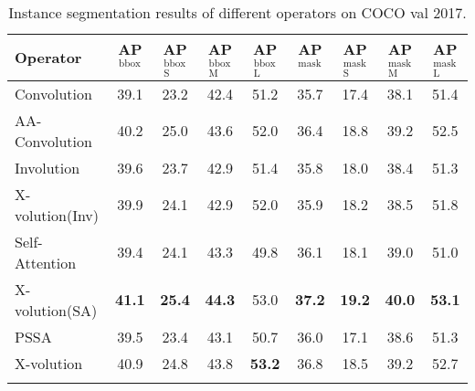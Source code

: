 \documentclass{article}
\newcommand{\cgap}[2]{
	\fontsize{6pt}{1em}\selectfont{(${#1}${#2})}
}
\newcommand{\apbbox}[1]{AP$^\text{bbox}_\text{#1}$}
\newcommand{\apmask}[1]{AP$^\text{mask}_\text{#1}$}
\begin{document}
\begin{table*}[t]\centering
\caption{Instance segmentation results of different operators on COCO val 2017.}
 \begin{spacing}{1.3}
 \small
\setlength\tabcolsep{0.9pt}
 \begin{tabular}{l|c|c|c|c|c|c|c|c}
        \Xhline{1.1pt}
		Operator
		& \fontsize{7pt}{1em}\selectfont \quad\apbbox{~}
		& \fontsize{7pt}{1em}\selectfont \quad\apbbox{S}
		& \fontsize{7pt}{1em}\selectfont \quad\apbbox{M}
		& \fontsize{7pt}{1em}\selectfont \quad\apbbox{L}
		& \fontsize{7pt}{1em}\selectfont \quad\apmask{~}
		& \fontsize{7pt}{1em}\selectfont \quad\apmask{S}
		& \fontsize{7pt}{1em}\selectfont \quad\apmask{M}
		& \fontsize{7pt}{1em}\selectfont \quad\apmask{L}\\ \hline
        
        Convolution &39.1 & 23.2 & 42.4 & 51.2 & 35.7 & 17.4 & 38.1 & 51.4 \\
		AA-Convolution~\cite{DBLP:conf/iccv/BelloZLVS19}
		& 40.2\cgap{+}{1.1} & 25.0\cgap{+}{1.8} & 43.6\cgap{+}{1.2} & 52.0\cgap{+}{0.8} & 36.4\cgap{+}{0.7} & 18.8\cgap{+}{1.4} & 39.2\cgap{+}{1.1} & 52.5\cgap{+}{1.1} \\
		\cline{1-9}
		

		Involution~\cite{DBLP:journals/corr/abs-2103-06255}
		& 39.6\cgap{+}{0.5} & 23.7\cgap{+}{0.5} & 42.9\cgap{+}{0.5} & 51.4\cgap{+}{0.2} & 35.8\cgap{+}{0.1} & 18.0\cgap{+}{0.6} & 38.4\cgap{+}{0.3} & 51.3\cgap{-}{0.1} \\
		X-volution(Inv) &  39.9\cgap{+}{0.8} & 24.1\cgap{+}{0.9} & 42.9\cgap{+}{0.5} & 52.0\cgap{+}{0.8} & 35.9\cgap{+}{0.2} & 18.2\cgap{+}{0.8} & 38.5\cgap{+}{0.4} & 51.8\cgap{+}{0.4}\\
		\cline{1-9}
		   
		Self-Attention~\cite{DBLP:conf/nips/VaswaniSPUJGKP17}
		& 39.4\cgap{+}{0.3} & 24.1\cgap{+}{0.9} & 43.3\cgap{+}{0.9} & 49.8\cgap{-}{1.4} & 36.1\cgap{+}{0.4} & 18.1\cgap{+}{0.7} & 39.0\cgap{+}{0.9} & 51.0\cgap{-}{0.4} \\
		X-volution(SA) & \textbf{41.1}\cgap{+}{2.0} & \textbf{25.4}\cgap{+}{2.2} & \textbf{44.3}\cgap{+}{1.9} & 53.0\cgap{+}{1.8} & \textbf{37.2}\cgap{+}{1.5} & \textbf{19.2}\cgap{+}{1.8} & \textbf{40.0}\cgap{+}{1.9} & \textbf{53.1}\cgap{+}{1.7}\\ 
		\cline{1-9}
	
		PSSA & 39.5\cgap{+}{0.4} & 23.4\cgap{+}{0.2} & 43.1\cgap{+}{0.7} & 50.7\cgap{-}{0.5} & 36.0\cgap{+}{0.3} & 17.1\cgap{-}{0.3} & 38.6\cgap{+}{0.5} & 51.3\cgap{-}{0.1}\\
		X-volution &  40.9\cgap{+}{1.8} & 24.8\cgap{+}{1.6} & 43.8\cgap{+}{1.4} & \textbf{53.2}\cgap{+}{2.0} & 36.8\cgap{+}{1.1} & 18.5\cgap{+}{1.1} & 39.2\cgap{+}{1.1} & 52.7\cgap{+}{1.3} \\

		\Xhline{1.0pt}

\end{tabular}
\label{tab_seg}
\end{spacing}
\end{table*}
\end{document}
